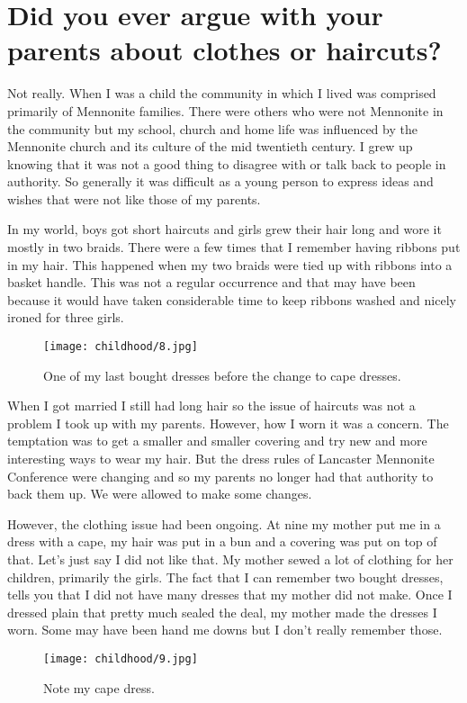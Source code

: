 \section{Did you ever argue with your parents about clothes or haircuts?}
Not really.
When I was a child the community in which I lived was comprised primarily of Mennonite families.
There were others who were not Mennonite in the community but my school, church and home life was influenced by the Mennonite church and its culture of the mid twentieth century.
I grew up knowing that it was not a good thing to disagree with or talk back to people in authority.
So generally it was difficult as a young person to express ideas and wishes that were not like those of my parents.

In my world, boys got short haircuts and girls grew their hair long and wore it mostly in two braids.
There were a few times that I remember having ribbons put in my hair.
This happened when my two braids were tied up with ribbons into a basket handle.
This was not a regular occurrence and that may have been because it would have taken considerable time to keep ribbons washed and nicely ironed for three girls.
\begin{figure}
\centering
\texttt{[image: childhood/8.jpg]}
\caption{
One of my last bought dresses before the change to cape dresses.
}
\end{figure}

When I got married I still had long hair so the issue of haircuts was not a problem I took up with my parents.
However, how I worn it was a concern.
The temptation was to get a smaller and smaller covering and try new and more interesting ways to wear my hair.
But the dress rules of Lancaster Mennonite Conference were changing and so my parents no longer had that authority to back them up.
We were allowed to make some changes.

However, the clothing issue had been ongoing.
At nine my mother put me in a dress with a cape, my hair was put in a bun and a covering was put on top of that.
Let's just say I did not like that.
My mother sewed a lot of clothing for her children, primarily the girls.
The fact that I can remember two bought dresses, tells you that I did not have many dresses that my mother did not make.
Once I dressed plain that pretty much sealed the deal, my mother made the dresses I worn.
Some may have been hand me downs but I don't really remember those.
\begin{figure}
\centering
\texttt{[image: childhood/9.jpg]}
\caption{
Note my cape dress.
}
\end{figure}

